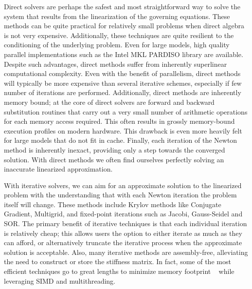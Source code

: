  Direct solvers are perhaps the safest and most straightforward way to
 solve the system that results from the linearization of the governing
 equations. These methods can be quite practical for relatively small
 problems when direct algebra is not very expensive. Additionally,
 these techniques are quite resilient to the conditioning of the
 underlying problem. Even for large models, high quality parallel
 implementations such as the Intel MKL PARDISO library are
 available. Despite such advantages, direct methods suffer from
 inherently superlinear computational complexity. Even with the
 benefit of parallelism, direct methods will typically be more
 expensive than several iterative schemes, especially if few number of
 iterations are performed. Additionally, direct methods are inherently
 memory bound; at the core of direct solvers are forward and backward
 substitution routines that carry out a very small number of
 arithmetic operations for each memory access required. This often
 results in grossly memory-bound execution profiles on modern
 hardware. This drawback is even more heavily felt for large models
 that do not fit in cache. Finally, each iteration of the Newton
 method is inherently inexact, providing only a step towards the
 converged solution. With direct methods we often find ourselves
 perfectly solving an inaccurate linearized approximation.

 With iterative solvers, we can aim for an approximate solution to the
 linearized problem with the understanding that with each Newton
 iteration the problem itself will change. These methods include
 Krylov methods like Conjugate Gradient, Multigrid, and fixed-point
 iterations such as Jacobi, Gauss-Seidel and SOR. The primary benefit
 of iterative techniques is that each individual iteration is
 relatively cheap; this allows users the option to either iterate as
 much as they can afford, or alternatively truncate the iterative
 process when the approximate solution is acceptable.  Also, many
 iterative methods are assembly-free, alleviating the need to
 construct or store the stiffness matrix.  In fact, some of the most
 efficient techniques go to great lengths to minimize memory footprint
 ~\citep{McAdaZSETTS:2011} while leveraging SIMD and multithreading.

